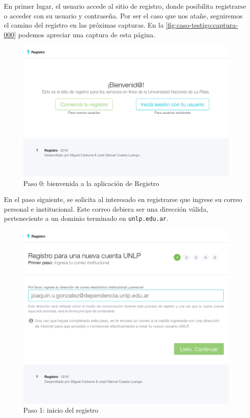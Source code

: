 En primer lugar, el usuario accede al sitio de registro, donde posibilita registrarse o acceder con su usuario y contraseña. Por ser el caso que nos atañe, seguiremos el camino del registro en las próximas capturas. En la \autoref{fig:caso-testigo:captura-000} podemos apreciar una captura de esta página.

\begin{figure}
  \centering
  \includegraphics[width=\textwidth,keepaspectratio]{src/images/05-capitulo-5/capturas/page_000.png}
  \caption{Paso 0: bienvenida a la aplicación de Registro}
  \label{fig:caso-testigo:captura-000}
\end{figure}

En el paso siguiente, se solicita al interesado en registrarse que ingrese su correo personal e institucional. Este correo debiera ser una dirección válida, perteneciente a un dominio terminado en \texttt{unlp.edu.ar}.

\begin{figure}
  \centering
  \includegraphics[width=\textwidth,keepaspectratio]{src/images/05-capitulo-5/capturas/page_001.png}
  \caption{Paso 1: inicio del registro}
  \label{fig:caso-testigo:captura-001}
\end{figure}

